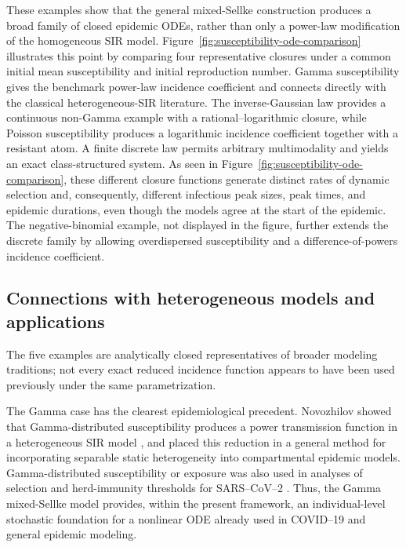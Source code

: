 \documentclass[pdflatex,sn-mathphys-ay]{sn-jnl}
\theoremstyle{thmstyleone}
\theoremstyle{thmstyletwo}
\theoremstyle{thmstylethree}
\begin{document}
These examples show that the general mixed-Sellke construction produces a broad family of closed epidemic ODEs, rather than only a power-law modification of the homogeneous SIR model. Figure~\ref{fig:susceptibility-ode-comparison} illustrates this point by comparing four representative closures under a common initial mean susceptibility and initial reproduction number. Gamma susceptibility gives the benchmark power-law incidence coefficient and connects directly with the classical heterogeneous-SIR literature. The inverse-Gaussian law provides a continuous non-Gamma example with a rational--logarithmic closure, while Poisson susceptibility produces a logarithmic incidence coefficient together with a resistant atom. A finite discrete law permits arbitrary multimodality and yields an exact class-structured system. As seen in Figure~\ref{fig:susceptibility-ode-comparison}, these different closure functions generate distinct rates of dynamic selection and, consequently, different infectious peak sizes, peak times, and epidemic durations, even though the models agree at the start of the epidemic. The negative-binomial example, not displayed in the figure, further extends the discrete family by allowing overdispersed susceptibility and a difference-of-powers incidence coefficient.

\subsection{Connections with heterogeneous models and applications}

The five examples are analytically closed representatives of broader
modeling traditions; not every exact reduced incidence function appears to
have been used previously under the same parametrization.

The Gamma case has the clearest epidemiological precedent. Novozhilov showed
that Gamma-distributed susceptibility produces a power transmission function
in a heterogeneous SIR model \cite{Novozhilov2008}, and \cite{DiekmannInaba2023}
placed this reduction in a general method for incorporating separable static
heterogeneity into compartmental epidemic models.
Gamma-distributed susceptibility or exposure was also used in analyses of
selection and herd-immunity thresholds for SARS--CoV--2
\citep{GomesEtAl2022,MontalbanEtAl2022}. Thus, the Gamma mixed-Sellke model
provides, within the present framework, an individual-level stochastic foundation
for a nonlinear ODE already used
in COVID--19 and general epidemic modeling.
\end{document}
